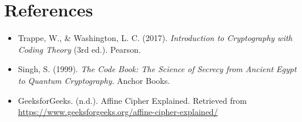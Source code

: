 \documentclass[12pt]{article}
\begin{document}
\section*{References}
\begin{itemize}
    \item Trappe, W., \& Washington, L. C. (2017). \textit{Introduction to Cryptography with Coding Theory} (3rd ed.). Pearson.
    \item Singh, S. (1999). \textit{The Code Book: The Science of Secrecy from Ancient Egypt to Quantum Cryptography}. Anchor Books.
    \item GeeksforGeeks. (n.d.). Affine Cipher Explained. Retrieved from \url{https://www.geeksforgeeks.org/affine-cipher-explained/}
\end{itemize}
\end{document}

